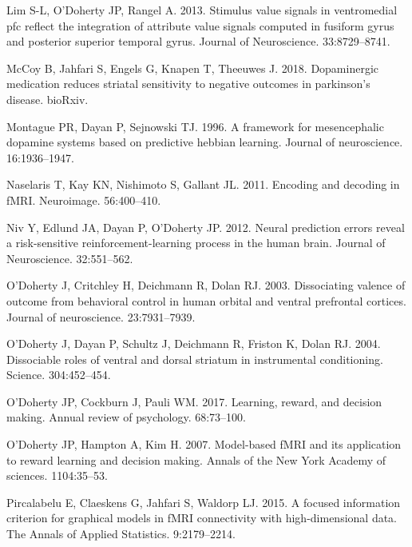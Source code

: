 \documentclass[]{article}
\begin{document}
\leavevmode\hypertarget{ref-Limetal2013}{}%
Lim S-L, O'Doherty JP, Rangel A. 2013. Stimulus value signals in
ventromedial pfc reflect the integration of attribute value signals
computed in fusiform gyrus and posterior superior temporal gyrus.
Journal of Neuroscience. 33:8729--8741.

\leavevmode\hypertarget{ref-Mccoyetal2018}{}%
McCoy B, Jahfari S, Engels G, Knapen T, Theeuwes J. 2018. Dopaminergic
medication reduces striatal sensitivity to negative outcomes in
parkinson's disease. bioRxiv.

\leavevmode\hypertarget{ref-Montagueetal1996}{}%
Montague PR, Dayan P, Sejnowski TJ. 1996. A framework for mesencephalic
dopamine systems based on predictive hebbian learning. Journal of
neuroscience. 16:1936--1947.

\leavevmode\hypertarget{ref-Naselarisetal2011}{}%
Naselaris T, Kay KN, Nishimoto S, Gallant JL. 2011. Encoding and
decoding in fMRI. Neuroimage. 56:400--410.

\leavevmode\hypertarget{ref-Nivetal2012}{}%
Niv Y, Edlund JA, Dayan P, O'Doherty JP. 2012. Neural prediction errors
reveal a risk-sensitive reinforcement-learning process in the human
brain. Journal of Neuroscience. 32:551--562.

\leavevmode\hypertarget{ref-Odohertyetal2003}{}%
O'Doherty J, Critchley H, Deichmann R, Dolan RJ. 2003. Dissociating
valence of outcome from behavioral control in human orbital and ventral
prefrontal cortices. Journal of neuroscience. 23:7931--7939.

\leavevmode\hypertarget{ref-Odohertyetal2004}{}%
O'Doherty J, Dayan P, Schultz J, Deichmann R, Friston K, Dolan RJ. 2004.
Dissociable roles of ventral and dorsal striatum in instrumental
conditioning. Science. 304:452--454.

\leavevmode\hypertarget{ref-Odohertyetal2017}{}%
O'Doherty JP, Cockburn J, Pauli WM. 2017. Learning, reward, and decision
making. Annual review of psychology. 68:73--100.

\leavevmode\hypertarget{ref-Odohertyetal2007}{}%
O'Doherty JP, Hampton A, Kim H. 2007. Model-based fMRI and its
application to reward learning and decision making. Annals of the New
York Academy of sciences. 1104:35--53.

\leavevmode\hypertarget{ref-Pircalabeluetal2015}{}%
Pircalabelu E, Claeskens G, Jahfari S, Waldorp LJ. 2015. A focused
information criterion for graphical models in fMRI connectivity with
high-dimensional data. The Annals of Applied Statistics. 9:2179--2214.
\end{document}
